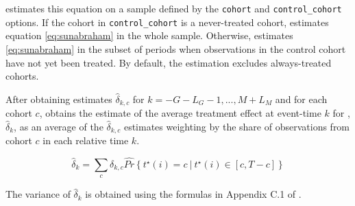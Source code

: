 \documentclass[12pt]{article}
\begin{document}
\xtevent estimates this equation on a sample defined by the \texttt{cohort} and \texttt{control\_cohort} options.
If the cohort in \texttt{control\_cohort} is a never-treated cohort, \xtevent estimates equation \eqref{eq:sunabraham} in the whole sample.
Otherwise, \xtevent estimates \eqref{eq:sunabraham} in the subset of periods when observations in the control cohort have not yet been treated.
By default, the estimation excludes always-treated cohorts.

After obtaining estimates $\hat{\delta}_{k,c}$ for $k=-G-L_G-1,...,M+L_M$ and for each cohort $c$, \xtevent obtains the estimate of the average treatment effect at event-time $k$ for , $\hat{\delta}_k$, as an average of the $\hat{\delta}_{k,c}$ estimates weighting by the share of observations from cohort $c$ in each relative time $k$.

\begin{equation*}
  \hat{\delta}_k = \sum_c \delta_{k,c} \hat{Pr} \left\{ t^{\star}(i) = c \ | \ t^{\star}(i) \in [c,T-c] \right\}
\end{equation*}

The variance of $\hat{\delta}_k$ is obtained using the formulas in Appendix C.1 of \cite{sun2021estimating}.
\end{document}
